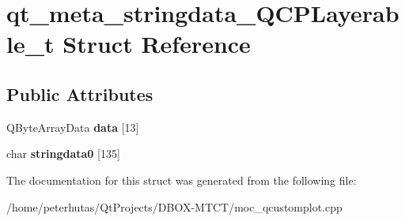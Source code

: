 \hypertarget{structqt__meta__stringdata___q_c_p_layerable__t}{}\section{qt\+\_\+meta\+\_\+stringdata\+\_\+\+Q\+C\+P\+Layerable\+\_\+t Struct Reference}
\label{structqt__meta__stringdata___q_c_p_layerable__t}
\subsection*{Public Attributes}
\begin{DoxyCompactItemize}
\item 
\mbox{\label{structqt__meta__stringdata___q_c_p_layerable__t_adaa7771b25eb1d5dc6cb97526d7a4995}} 
Q\+Byte\+Array\+Data {\bfseries data} \mbox{[}13\mbox{]}
\item 
\mbox{\label{structqt__meta__stringdata___q_c_p_layerable__t_a63a3660ec480a3586f023e4d498cee3d}} 
char {\bfseries stringdata0} \mbox{[}135\mbox{]}
\end{DoxyCompactItemize}


The documentation for this struct was generated from the following file\+:\begin{DoxyCompactItemize}
\item 
/home/peterhutas/\+Qt\+Projects/\+D\+B\+O\+X-\/\+M\+T\+C\+T/moc\+\_\+qcustomplot.\+cpp\end{DoxyCompactItemize}
